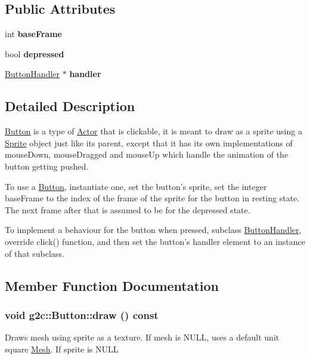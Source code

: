 \subsection*{Public Attributes}
\begin{DoxyCompactItemize}
\item 
\hypertarget{classg2c_1_1_button_a797aaa2f037cf86bdefe5995ae6f131d}{
int {\bfseries baseFrame}}
\label{classg2c_1_1_button_a797aaa2f037cf86bdefe5995ae6f131d}

\item 
\hypertarget{classg2c_1_1_button_ab94592bd21a7a9032e2d2ebed86d137f}{
bool {\bfseries depressed}}
\label{classg2c_1_1_button_ab94592bd21a7a9032e2d2ebed86d137f}

\item 
\hypertarget{classg2c_1_1_button_a6855cc7dd7780ffa232e3a8a542c71d0}{
\hyperlink{classg2c_1_1_button_handler}{ButtonHandler} $\ast$ {\bfseries handler}}
\label{classg2c_1_1_button_a6855cc7dd7780ffa232e3a8a542c71d0}

\end{DoxyCompactItemize}


\subsection{Detailed Description}
\hyperlink{classg2c_1_1_button}{Button} is a type of \hyperlink{classg2c_1_1_actor}{Actor} that is clickable, it is meant to draw as a sprite using a \hyperlink{classg2c_1_1_sprite}{Sprite} object just like its parent, except that it has its own implementations of mouseDown, mouseDragged and mouseUp which handle the animation of the button getting pushed.

To use a \hyperlink{classg2c_1_1_button}{Button}, instantiate one, set the button's sprite, set the integer baseFrame to the index of the frame of the sprite for the button in resting state. The next frame after that is assumed to be for the depressed state.

To implement a behaviour for the button when pressed, subclass \hyperlink{classg2c_1_1_button_handler}{ButtonHandler}, override click() function, and then set the button's handler element to an instance of that subclass. 

\subsection{Member Function Documentation}
\hypertarget{classg2c_1_1_button_a1d3bfdc06e37d9e533d1cd3b8d308579}{
\subsubsection[{draw}]{\setlength{\rightskip}{0pt plus 5cm}void g2c::Button::draw () const}}
\label{classg2c_1_1_button_a1d3bfdc06e37d9e533d1cd3b8d308579}
Draws mesh using sprite as a texture. If mesh is NULL, uses a default unit square \hyperlink{classg2c_1_1_mesh}{Mesh}. If sprite is NULL 

